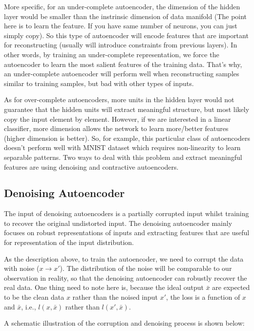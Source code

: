 More specific, for an under-complete autoencoder, the dimension of the hidden layer would be smaller than the instrinsic dimension of data manifold (The point here is to learn the feature. If you have same number of neurons, you can just simply copy). So this type of autoencoder will encode features that are important for reconstructing (usually will introduce constraints from previous layers). In other words, by training an under-complete representation, we force the autoencoder to learn the most salient features of the training data. That's why, an under-complete autoencoder will perform well when reconstructing samples similar to training samples, but bad with other types of inputs.  

As for over-complete autoencoders, more units in the hidden layer would not guarantee that the hidden units will extract meaningful structure, but most likely copy the input element by element. However, if we are interested in a linear classifier, more dimension allows the network to learn more/better features (higher dimension is better). So, for example, this particular class of autoencoders doesn't perform well with MNIST dataset which requires non-linearity to learn separable patterns. Two ways to deal with this problem and extract meaningful features are using denoising and contractive autoencoders.

\subsection{Denoising Autoencoder}

The input of denoising autoencoders is a partially corrupted input whilst training to recover the original undistorted input. The denoising autoencoder mainly focuses on robust representations of inputs and extracting features that are useful for representation of the input distribution.

As the description above, to train the autoencoder, we need to corrupt the data with noise ($x \rightarrow x'$). The distribution of the noise will be comparable to our observation in reality, so that the denoising autoencoder can robustly recover the real data.
One thing need to note here is, because the ideal output $\bar{x}$ are expected to be the clean data $x$ rather than the noised input $x'$, the loss is a function of $x$ and $\bar{x}$, i.e., $l(x,\bar{x})$ rather than $l(x',\bar{x})$.

A schematic illustration of the corruption and denoising process is shown below:

